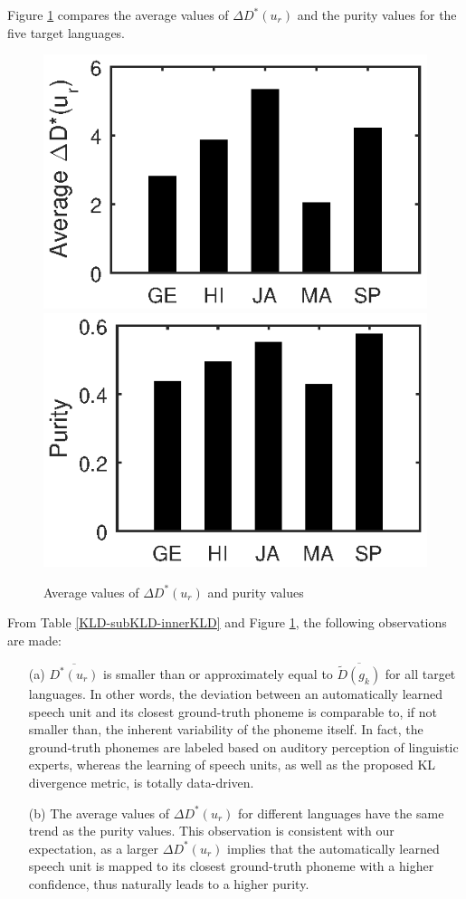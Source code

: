 \documentclass[a4paper]{article}
\begin{document}
Figure \ref{dkld-purity} compares the average values of $\Delta D^* (u_r)$ and the purity values for the five target languages.
\begin{figure}[htbp]
 \centering
 \includegraphics[width = 0.486 \linewidth]{kldgapfixed.eps}
 \includegraphics[width = 0.49 \linewidth]{purityfixed.eps}
 \caption{Average values of $\Delta D^* (u_r)$ and purity values}
  \label{dkld-purity}
 \end{figure}  
From Table \ref{KLD-subKLD-innerKLD} and Figure \ref{dkld-purity}, the following observations are made:
\begin{itemize}
\item[(a)] $\overline{D^* (u_r)}$ is smaller than or approximately equal to $\overline{\widetilde{D} (g_k)}$ for all target languages. In other words, the deviation between an automatically learned speech unit and its closest ground-truth phoneme is comparable to, if not smaller than, the inherent variability of the phoneme itself. In fact, the ground-truth phonemes are labeled based on auditory perception of linguistic experts, whereas the learning of speech units, as well as the proposed KL divergence metric, is totally data-driven.
\item[(b)] The average values of $\Delta D^* (u_r)$ for different languages have the same trend as the purity values. This observation is consistent with our expectation, as a larger $\Delta D^* (u_r)$ implies that the automatically learned speech unit is mapped to its closest ground-truth phoneme with a higher confidence, thus naturally leads to a higher purity. 
\end{itemize}
\end{document}
